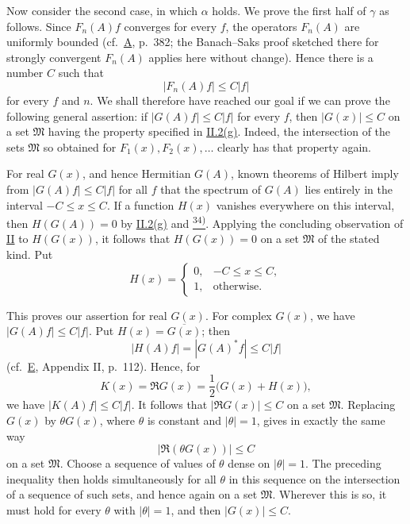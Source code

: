 \documentclass[12pt,b5paper,twoside]{article}
\newcommand{\noteref}[1]{%
  \hyperlink{note:#1}{\textsuperscript{#1)}}}
\begin{document}
Now consider the second case, in which
\hyperref[thm:4.alpha]{\(\alpha\)} holds.  We prove the first half of
\hyperref[thm:4.gamma]{\(\gamma\)} as follows.  Since \(F_n(A)f\)
converges for every
\(f\), the operators \(F_n(A)\) are uniformly bounded (cf.\
\hyperref[ref:A]{A}, p.~382; the Banach--Saks proof sketched there for
strongly convergent \(F_n(A)\) applies here without change).  Hence there
is a number \(C\) such that
\[
 |F_n(A)f|\leq C|f|
\]
for every \(f\) and \(n\).  We shall therefore have reached our goal if we
can prove the following general assertion: if
\(|G(A)f|\leq C|f|\) for every \(f\), then \(|G(x)|\leq C\) on a set
\(\mathfrak M\) having the property specified in
\hyperref[prop:II.2.g]{II.2(g)}.  Indeed, the intersection of the sets
\(\mathfrak M\) so obtained for \(F_1(x),F_2(x),\ldots\) clearly has that
property again.

For real \(G(x)\), and hence Hermitian \(G(A)\), known theorems of Hilbert
imply from \(|G(A)f|\leq C|f|\) for all \(f\) that the spectrum of \(G(A)\)
lies entirely in the interval \(-C\leq x\leq C\).  If a function \(H(x)\)
vanishes everywhere on this interval, then
\(H(G(A))=0\) by \hyperref[prop:II.2.g]{II.2(g)} and \noteref{34}.
Applying the concluding observation of \hyperref[sec:II]{II} to
\(H(G(x))\), it follows that \(H(G(x))=0\) on a set \(\mathfrak M\) of
the stated kind.  Put
\[
 H(x)=
 \begin{cases}
  0,&-C\leq x\leq C,\\
  1,&\text{otherwise}.
 \end{cases}
\]

This proves our assertion for real \(G(x)\).  For complex \(G(x)\), we
have \(|G(A)f|\leq C|f|\).  Put \(H(x)=\overline{G(x)}\); then
\[
 |H(A)f|=|G(A)^*f|\leq C|f|
\]
(cf.\ \hyperref[ref:E]{E}, Appendix II, p.~112).  Hence, for
\[
 K(x)=\Re G(x)=\frac12\bigl(G(x)+H(x)\bigr),
\]
we have \(|K(A)f|\leq C|f|\).  It follows that
\(|\Re G(x)|\leq C\) on a set \(\mathfrak M\).  Replacing \(G(x)\) by
\(\theta G(x)\), where \(\theta\) is constant and \(|\theta|=1\), gives
in exactly the same way
\[
 |\Re(\theta G(x))|\leq C
\]
on a set \(\mathfrak M\).  Choose a sequence of values of \(\theta\)
dense on \(|\theta|=1\).  The preceding inequality then holds
simultaneously for all \(\theta\) in this sequence on the intersection of
a sequence of such sets, and hence again on a set \(\mathfrak M\).
Wherever this is so, it must hold for every \(\theta\) with
\(|\theta|=1\), and then \(|G(x)|\leq C\).
\end{document}
